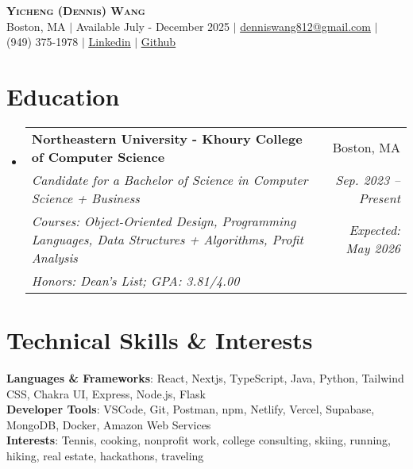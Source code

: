 \documentclass[letterpaper,11pt]{article}
\makeatletter
\newcommand{\eduSubheading}[7]{
  \vspace{-2pt}\item
    \begin{tabular*}{0.97\textwidth}[t]{l@{\extracolsep{\fill}}r}
      \textbf{#1} & #2 \\
      \vspace{-2pt}
      \textit{\small#3} & \hspace{-10cm}\textit{\small #4} \\
      \vspace{-2pt}
      \textit{\footnotesize#5}&\textit{\small #6} \\
      
      \textit{\footnotesize#7}
    \end{tabular*}\vspace{-6pt}
}
\newcommand{\resumeSubHeadingListStart}{\begin{itemize}[leftmargin=0.15in, label={}]}
\newcommand{\resumeSubHeadingListEnd}{\end{itemize}}
\makeatother
\begin{document}

\begin{center}
\textbf{\Huge \scshape Yicheng (Dennis) Wang} \\ \vspace{1pt}
\small Boston, MA  $|$ Available July - December 2025 $|$ \href{mailto:denniswang812@gmail.com}{\underline{denniswang812@gmail.com}} $|$ (949) 375-1978 $|$ \href{https://www.linkedin.com/in/denniswang812/}{\underline{Linkedin}} $|$ \href{https://github.com/denniwang}{\underline{Github}} 
\end{center} 


\section{Education}
  \resumeSubHeadingListStart
    \eduSubheading
      {Northeastern University - Khoury College of Computer Science}{Boston, MA}
      {Candidate for a Bachelor of Science in Computer Science + Business} {Sep. 2023 -- Present}
       {Courses: Object-Oriented Design, Programming Languages, Data Structures + Algorithms, Profit Analysis}{Expected: May 2026}
       {Honors: Dean's List; GPA: 3.81/4.00}
  \resumeSubHeadingListEnd


\section{Technical Skills \& Interests}
 \begin{itemize}[leftmargin=0.15in, label={}]
    \small{\item{
     \textbf{Languages \& Frameworks}{: React, Nextjs, TypeScript, Java, Python, Tailwind CSS, Chakra UI, Express, Node.js, Flask} \\
     \textbf{Developer Tools}{: VSCode, Git, Postman, npm, Netlify, Vercel, Supabase, MongoDB, Docker,  Amazon Web Services} \\
     \textbf{Interests}{: Tennis, cooking, nonprofit work, college consulting, skiing, running, hiking, real estate, hackathons, traveling}
     \vspace{-5pt}
    }}
    
 \end{itemize}

\end{document}
